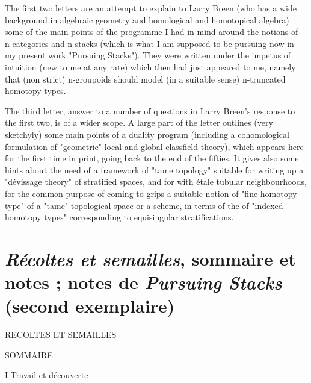\documentclass[11pt,a4paper]{article}
\begin{document}
The first two letters are an attempt to explain to Larry Breen (who has a wide
background in algebraic geometry and homological and homotopical algebra) some
of the main points of the programme I had in mind around the notions of
n-categories and n-stacks (which is what I am supposed to be pursuing now in my
present work "Pursuing Stacks"). They were written under the impetus of
  intuition  (new to me at any rate) which
then had just appeared to me, namely that (non strict) n-groupoids should model
(in a suitable sense) n-truncated homotopy types.

The third letter,  answer to a number of questions in Larry
Breen's response to the first two, is of a wider scope. A large part of the
letter outlines (very sketchyly) some main points of a duality program
(including a cohomological formulation of "geometric" local and global
classfield theory), which appears here for the first time in print,
 going back to the end of the fifties. It gives also some hints
about the need of a framework of "tame topology" suitable for writing up a
"dévissage theory" of stratified spaces, and for \struck{\ill{}}
 with étale tubular neighbourhoods, for the common purpose of
coming to grips   a suitable notion of "fine homotopy
type" of a "tame" topological space or  a scheme, in terms of the
  of "indexed homotopy types"
corresponding to equisingular stratifications.

\section{\emph{Récoltes et semailles}, sommaire et notes ; notes de \emph{Pursuing Stacks} (second exemplaire)}


RECOLTES ET SEMAILLES

SOMMAIRE

I Travail et découverte
\end{document}
